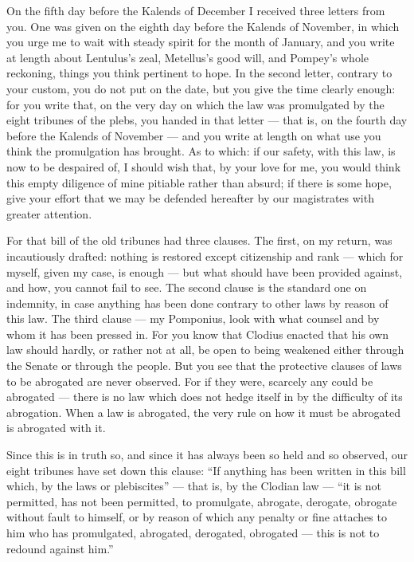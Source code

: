 

 On the fifth day before the Kalends of December I received three letters from you. One was given on the eighth day before the Kalends of November, in which you urge me to wait with steady spirit for the month of January, and you write at length about Lentulus's zeal, Metellus's good will, and Pompey's whole reckoning, things you think pertinent to hope. In the second letter, contrary to your custom, you do not put on the date, but you give the time clearly enough: for you write that, on the very day on which the law was promulgated by the eight tribunes of the plebs, you handed in that letter --- that is, on the fourth day before the Kalends of November --- and you write at length on what use you think the promulgation has brought. As to which: if our safety, with this law, is now to be despaired of, I should wish that, by your love for me, you would think this empty diligence of mine pitiable rather than absurd; if there is some hope, give your effort that we may be defended hereafter by our magistrates with greater attention.

 For that bill of the old tribunes had three clauses. The first, on my return, was incautiously drafted: nothing is restored except citizenship and rank --- which for myself, given my case, is enough --- but what should have been provided against, and how, you cannot fail to see. The second clause is the standard one on indemnity, in case anything has been done contrary to other laws by reason of this law. The third clause --- my Pomponius, look with what counsel and by whom it has been pressed in. For you know that Clodius enacted that his own law should hardly, or rather not at all, be open to being weakened either through the Senate or through the people. But you see that the protective clauses of laws to be abrogated are never observed. For if they were, scarcely any could be abrogated --- there is no law which does not hedge itself in by the difficulty of its abrogation. When a law is abrogated, the very rule on how it must be abrogated is abrogated with it.

 Since this is in truth so, and since it has always been so held and so observed, our eight tribunes have set down this clause: ``If anything has been written in this bill which, by the laws or plebiscites'' --- that is, by the Clodian law --- ``it is not permitted, has not been permitted, to promulgate, abrogate, derogate, obrogate without fault to himself, or by reason of which any penalty or fine attaches to him who has promulgated, abrogated, derogated, obrogated --- this is not to redound against him.''

